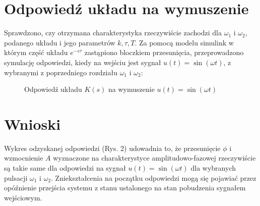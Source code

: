\documentclass{article}
\begin{document}

\section{Odpowiedź układu na wymuszenie}

Sprawdzono, czy otrzymana charakterystyka rzeczywiście zachodzi dla \( \omega_1\) i \(\omega_2 \), podanego układu i jego parametrów \(k, \tau, T\).
Za pomocą modelu simulink w którym część układu \(e^{-s\tau}\) zastąpiono bloczkiem przesunięcia, przeprowadzono symulację odpowiedzi, kiedy na wejściu jest sygnał \(u(t)=\sin(\omega t)\), z wybranymi z poprzedniego rozdziału \( \omega_1\) i \(\omega_2 \):


\begin{figure}[h]
\centering
{}
\caption{Odpowiedź układu \( K(s) \) na wymuszenie \(u(t)=\sin(\omega t)\)}
\end{figure}

\section{Wnioski}

Wykres odzyskanej odpowiedzi (Rys. 2) udowadnia to, że przesunięcie \(\phi\) i wzmocnienie \(A\) wyznaczone na charakterystyce amplitudowo-fazowej  rzeczywiście są takie same dla odpowiedzi na sygnał \(u(t)=\sin(\omega t)\) dla wybranych pulsacji \( \omega_1\) i \(\omega_2 \). Zniekształcenia na początku odpowiedzi mogą się pojawiać przez opóźnienie przejścia systemu z stanu ustalonego na stan pobudzenia sygnałem wejściowym.
\end{document}
